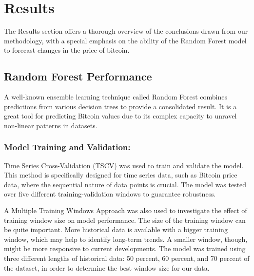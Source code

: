 \def\baselinestretch{1}

\chapter{Results}

\def\baselinestretch{1.44}

The Results section offers a thorough overview of the conclusions drawn from our methodology, with a special emphasis on the ability of the Random Forest model to forecast changes in the price of bitcoin.

\smallskip

\goodbreak
\section{Random Forest Performance}
\goodbreak

A well-known ensemble learning technique called Random Forest combines predictions from various decision trees to provide a consolidated result. It is a great tool for predicting Bitcoin values due to its complex capacity to unravel non-linear patterns in datasets.


\subsection{Model Training and Validation:}

Time Series Cross-Validation (TSCV) was used to train and validate the model. This method is specifically designed for time series data, such as Bitcoin price data, where the sequential nature of data points is crucial. The model was tested over five different training-validation windows to guarantee robustness.

A Multiple Training Windows Approach was also used to investigate the effect of training window size on model performance. The size of the training window can be quite important. More historical data is available with a bigger training window, which may help to identify long-term trends. A smaller window, though, might be more responsive to current developments. The model was trained using three different lengths of historical data: 50 percent, 60 percent, and 70 percent of the dataset, in order to determine the best window size for our data.


